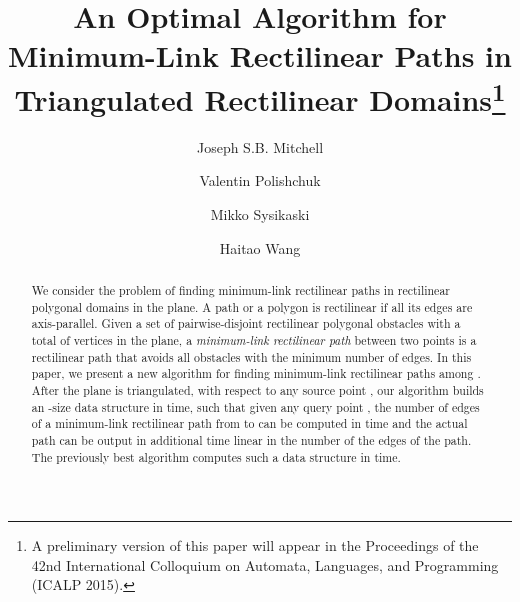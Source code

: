 \documentclass[english,runningheads,11pt]{llncs-revised}
\begin{document}
\title{An Optimal Algorithm for Minimum-Link Rectilinear Paths in Triangulated Rectilinear Domains\thanks{A preliminary version of
this paper will appear in the Proceedings of the 42nd International Colloquium on Automata, Languages, and Programming (ICALP 2015).
}
}

\author{Joseph S.B. Mitchell
\and
Valentin Polishchuk
\and
Mikko Sysikaski
\and
Haitao Wang
}



\maketitle

\pagestyle{plain}
\setcounter{page}{1}


\vspace{-0.2in}
\begin{abstract}
We consider the problem of finding minimum-link
rectilinear paths in rectilinear polygonal domains in the plane.
A path or a polygon is rectilinear if all its edges are axis-parallel.
Given a set  of  pairwise-disjoint rectilinear polygonal obstacles
with a total of  vertices in the plane, a {\em minimum-link rectilinear
path} between two points is a rectilinear path that avoids all
obstacles with the minimum number of edges.
In this paper, we present a new algorithm for finding minimum-link rectilinear paths among .
After the plane is triangulated, with respect to any source point ,  our algorithm
builds an -size data structure in  time, such
that given any query point , the number of edges of a minimum-link
rectilinear path from  to  can be computed in
 time and the actual path can be output in additional time
linear in the number of the edges of the path. The previously best algorithm
computes such a data structure in  time.
\end{abstract}
\end{document}
